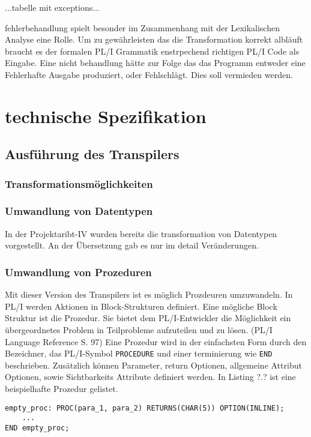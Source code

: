 ...tabelle mit exceptions...

fehlerbehandlung spielt besonder im Zusammenhang mit der Lexikalischen Analyse eine Rolle. Um zu gewährleisten das die Transformation korrekt albläuft braucht es der formalen PL/I Grammatik enstrpechend richtigen PL/I Code als Eingabe. Eine nicht behandlung hätte zur Folge das das Programm entweder eine Fehlerhafte Ausgabe produziert, oder Fehlschlägt. Dies soll vermieden werden.

\section{technische Spezifikation}
\subsection{Ausführung des Transpilers}
\subsubsection{Transformationsmöglichkeiten}
\subsubsection{Umwandlung von Datentypen}
In der Projektaribt-IV wurden bereits die transformation von Datentypen vorgestellt. An der Übersetzung gab es nur im detail Veränderungen.

\subsubsection{Umwandlung von Prozeduren}

Mit dieser Version des Transpilers ist es möglich Prozdeuren umzuwandeln.
In PL/I werden Aktionen in Block-Strukturen definiert. Eine mögliche Block Struktur ist die Prozedur. Sie bietet dem PL/I-Entwickler die Möglichkeit ein übergeordnetes Problem
in Teilprobleme aufzuteilen und zu lösen. (PL/I Language Reference S. 97)
Eine Prozedur wird in der einfachsten Form durch den Bezeichner, das PL/I-Symbol \verb+PROCEDURE+ und einer terminierung wie \verb+END+
beschrieben.
Zusätzlich können Parameter, return Optionen, allgemeine Attribut Optionen, sowie Sichtbarkeits Attribute definiert werden.
In Listing ?.? ist eine beispielhafte Prozedur gelistet.

\begin{verbatim}
empty_proc: PROC(para_1, para_2) RETURNS(CHAR(5)) OPTION(INLINE);
	...
END empty_proc;
\end{verbatim}

